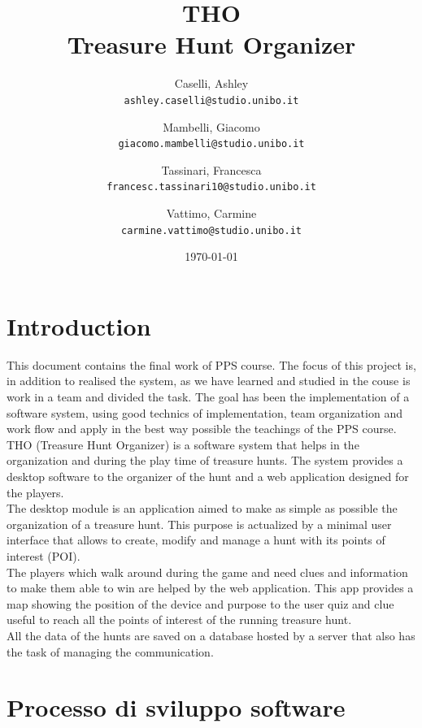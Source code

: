 \documentclass[12pt, italian]{article}
\title{\textbf{THO\\Treasure Hunt Organizer}}
\author{
	Caselli, Ashley\\
	\texttt{ashley.caselli@studio.unibo.it}
	\and
	Mambelli, Giacomo\\
	\texttt{giacomo.mambelli@studio.unibo.it}
	\and
	Tassinari, Francesca\\
	\texttt{francesc.tassinari10@studio.unibo.it}
	\and
	Vattimo, Carmine\\
	\texttt{carmine.vattimo@studio.unibo.it}
}
\date{\today}
\begin{document}
\maketitle
\newpage
\tableofcontents
\newpage

\section{Introduction}
This document contains the final work of PPS course. The focus of this project is, in addition to realised the system, as we have learned and studied in the couse is work in a team and divided the task.
The goal has been the implementation of a software system, using good technics of implementation, team organization and work flow and apply in the best way possible the teachings of the PPS course.\\
THO (Treasure Hunt Organizer) is a software system that helps in the organization and during the play time of treasure hunts.
The system provides a desktop software to the organizer of the hunt and a web application designed for the players.\\
The desktop module is an application aimed to make as simple as possible the organization of a treasure hunt. This purpose is actualized by a minimal user interface that allows to create, modify and manage a hunt with its points of interest (POI).\\
The players which walk around during the game and need clues and information to make them able to win are helped by the web application. This app provides a map showing the position of the device and purpose to the user quiz and clue useful to reach all the points of interest of the running treasure hunt.\\
All the data of the hunts are saved on a database hosted by a server that also has the task of managing the communication.

\section{Processo di sviluppo software}
\end{document}
